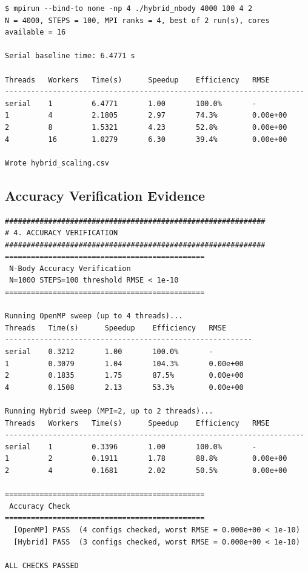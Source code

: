 \documentclass[11pt,a4paper]{article}
\begin{document}
\begin{lstlisting}[caption={Hybrid MPI+OpenMP, $N=4000$, 4 MPI ranks. Fastest overall result: 1.0279\,s}]
$ mpirun --bind-to none -np 4 ./hybrid_nbody 4000 100 4 2
N = 4000, STEPS = 100, MPI ranks = 4, best of 2 run(s), cores available = 16

Serial baseline time: 6.4771 s

Threads   Workers   Time(s)      Speedup    Efficiency   RMSE
---------------------------------------------------------------------
serial    1         6.4771       1.00       100.0%       -
1         4         2.1805       2.97       74.3%        0.00e+00
2         8         1.5321       4.23       52.8%        0.00e+00
4         16        1.0279       6.30       39.4%        0.00e+00

Wrote hybrid_scaling.csv
\end{lstlisting}

\subsection{Accuracy Verification Evidence}

\begin{lstlisting}[caption={Accuracy verification: every parallel configuration matches the serial baseline exactly}]
############################################################
# 4. ACCURACY VERIFICATION
############################################################
==============================================
 N-Body Accuracy Verification
 N=1000 STEPS=100 threshold RMSE < 1e-10
==============================================

Running OpenMP sweep (up to 4 threads)...
Threads   Time(s)      Speedup    Efficiency   RMSE
---------------------------------------------------------
serial    0.3212       1.00       100.0%       -
1         0.3079       1.04       104.3%       0.00e+00
2         0.1835       1.75       87.5%        0.00e+00
4         0.1508       2.13       53.3%        0.00e+00

Running Hybrid sweep (MPI=2, up to 2 threads)...
Threads   Workers   Time(s)      Speedup    Efficiency   RMSE
---------------------------------------------------------------------
serial    1         0.3396       1.00       100.0%       -
1         2         0.1911       1.78       88.8%        0.00e+00
2         4         0.1681       2.02       50.5%        0.00e+00

==============================================
 Accuracy Check
==============================================
  [OpenMP] PASS  (4 configs checked, worst RMSE = 0.000e+00 < 1e-10)
  [Hybrid] PASS  (3 configs checked, worst RMSE = 0.000e+00 < 1e-10)

ALL CHECKS PASSED
\end{lstlisting}
\end{document}
